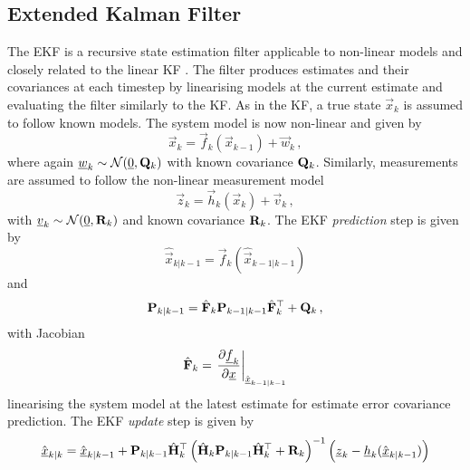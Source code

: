 % 
% 

\subsection{Extended Kalman Filter}\label{subsec:prelims:ekf}
The EKF is a recursive state estimation filter applicable to non-linear models and closely related to the linear KF \cite{andersonOptimalFiltering1979,theanalyticsciencescorporationAppliedOptimalEstimation1974}. The filter produces estimates and their covariances at each timestep by linearising models at the current estimate and evaluating the filter similarly to the KF. As in the KF, a true state $\vec{x}_k$ is assumed to follow known models. The system model is now non-linear and given by
\begin{equation}\label{eq:prelims:nonlin_gauss_system_model}
    \vec{x}_k = \vec{f}_k(\vec{x}_{k-1}) + \vec{w}_k\,,
\end{equation}
where again ${\underline{w}}_k \sim \mathcal{N}({\underline{0}}, {{\mathbf{Q}}}_k)$ with known covariance ${{\mathbf{Q}}}_k$. Similarly, measurements are assumed to follow the non-linear measurement model
\begin{equation}\label{eq:prelims:nonlin_gauss_measurement_model}
    \vec{z}_k = \vec{h}_k(\vec{x}_k) + \vec{v}_k\,,
\end{equation}
with ${\underline{v}}_k \sim \mathcal{N}({\underline{0}}, {{\mathbf{R}}}_k)$ and known covariance ${{\mathbf{R}}}_k$. The EKF \textit{prediction} step is given by
\begin{equation}\label{eq:prelims:ekf_est_predict}
    \hat{\vec{x}}_{k|k-1} = \vec{f}_k\left(\hat{\vec{x}}_{k-1|k-1}\right)
\end{equation}
and
\begin{equation}\label{eq:prelims:ekf_cov_predict}
    {\ensuremath{{\mathbf{P}}}}_{k|k-1} = \hat{{{\mathbf{F}}}}_k {{\mathbf{P}}}_{k-1|k-1} \hat{{{\mathbf{F}}}}_k^\top + {{\mathbf{Q}}}_k\,,
\end{equation}
with Jacobian
\begin{equation}\label{eq:prelims:ekf_predict_jacobian}
    \hat{{{\mathbf{F}}}}_k = \left.\frac{\partial {\underline{f}}_k}{\partial {\underline{x}}}\right|_{\hat{{\underline{x}}}_{k-1|k-1}}
\end{equation}
linearising the system model at the latest estimate for estimate error covariance prediction. The EKF \textit{update} step is given by
\begin{equation}\label{eq:prelims:ekf_est_update}
    \hat{{\underline{x}}}_{k|k} = \hat{{\underline{x}}}_{k|k-1}+{{\mathbf{P}}}_{k|k-1}\hat{{{\mathbf{H}}}}_k^\top\left(\hat{{{\mathbf{H}}}}_k{{\mathbf{P}}}_{k|k-1}\hat{{{\mathbf{H}}}}_k^\top + {{\mathbf{R}}}_k\right)^{-1}\left({\underline{z}}_k-{\underline{h}}_k(\hat{{\underline{x}}}_{k|k-1})\right)
\end{equation}
